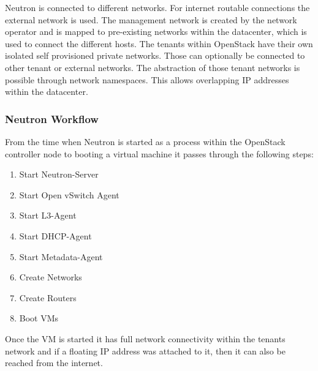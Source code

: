 Neutron is connected to different networks. For internet routable connections the external network is used. The management network is created by the network operator and is mapped to pre-existing networks within the datacenter, which is used to connect the different hosts. The tenants within OpenStack have their own isolated self provisioned private networks. Those can optionally be connected to other tenant or external networks. The abstraction of those tenant networks is possible through network namespaces. This allows overlapping IP addresses within the datacenter.


\subsubsection{Neutron Workflow}

From the time when Neutron is started as a process within the OpenStack controller node to booting a virtual machine it passes through the following steps:

\begin{enumerate}
\item Start Neutron-Server
\item Start Open vSwitch Agent
\item Start L3-Agent
\item Start DHCP-Agent
\item Start Metadata-Agent
\item Create Networks
\item Create Routers
\item Boot VMs
\end{enumerate}

Once the VM is started it has full network connectivity within the tenants network and if a floating IP address was attached to it, then it can also be reached from the internet.

%
%


